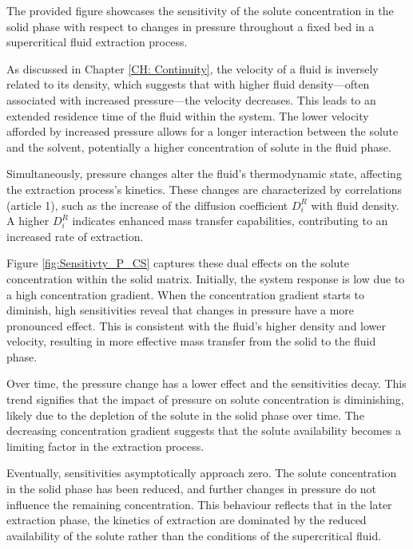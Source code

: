 \documentclass[../Article_Sensitivity_Analsysis.tex]{subfiles}
\begin{document}
    The provided figure showcases the sensitivity of the solute concentration in the solid phase with respect to changes in pressure throughout a fixed bed in a supercritical fluid extraction process. 
    
    As discussed in Chapter \ref{CH: Continuity}, the velocity of a fluid is inversely related to its density, which suggests that with higher fluid density—often associated with increased pressure—the velocity decreases. This leads to an extended residence time of the fluid within the system. The lower velocity afforded by increased pressure allows for a longer interaction between the solute and the solvent, potentially a higher concentration of solute in the fluid phase.
    
    Simultaneously, pressure changes alter the fluid's thermodynamic state, affecting the extraction process's kinetics. These changes are characterized by correlations ({\color{red}article 1}), such as the increase of the diffusion coefficient $D_i^R$ with fluid density. A higher $D_i^R$ indicates enhanced mass transfer capabilities, contributing to an increased rate of extraction.
    
    Figure \ref{fig:Sensitivty_P_CS} captures these dual effects on the solute concentration within the solid matrix. Initially, the system response is low due to a high concentration gradient. When the concentration gradient starts to diminish, high sensitivities reveal that changes in pressure have a more pronounced effect. This is consistent with the fluid's higher density and lower velocity, resulting in more effective mass transfer from the solid to the fluid phase.
    
    Over time, the pressure change has a lower effect and the sensitivities decay. This trend signifies that the impact of pressure on solute concentration is diminishing, likely due to the depletion of the solute in the solid phase over time. The decreasing concentration gradient suggests that the solute availability becomes a limiting factor in the extraction process.
    
    Eventually, sensitivities asymptotically approach zero. The solute concentration in the solid phase has been reduced, and further changes in pressure do not influence the remaining concentration. This behaviour reflects that in the later extraction phase, the kinetics of extraction are dominated by the reduced availability of the solute rather than the conditions of the supercritical fluid.
\end{document}
